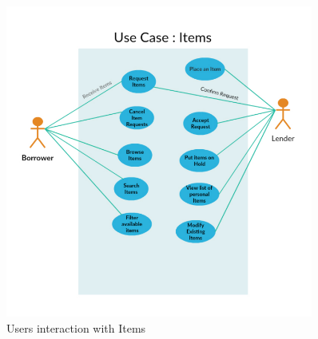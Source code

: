 \documentclass[a4paper]{article}
\begin{document}
\begin{figure}[H] 
  \centering
  \includegraphics[width=0.9\textwidth]{usecase-Items.PNG}\hfill
  \caption{Users interaction with Items}\label{UseCase-Items}
\end{figure}
\end{document}
